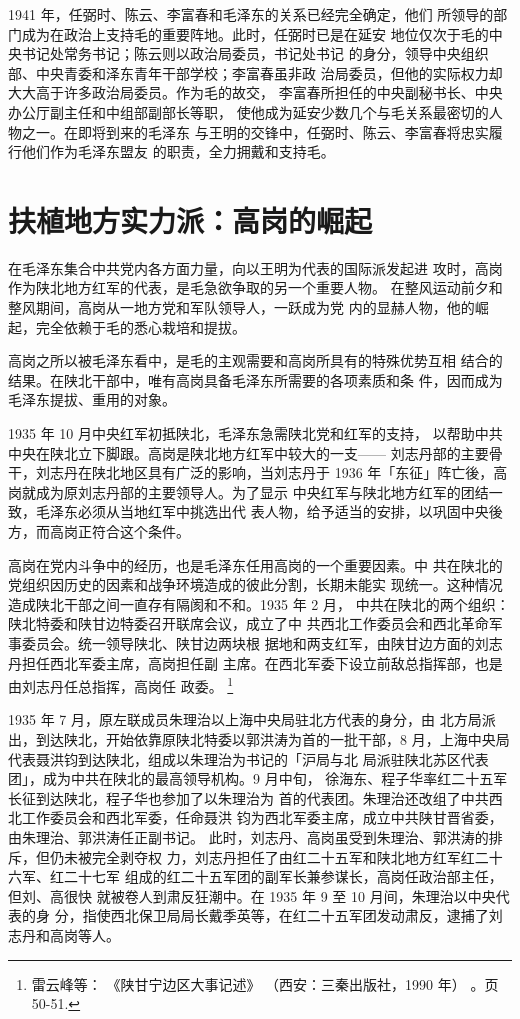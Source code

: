 1941 年，任弼时、陈云、李富春和毛泽东的关系已经完全确定，他们
所领导的部门成为在政治上支持毛的重要阵地。此时，任弼时已是在延安
地位仅次于毛的中央书记处常务书记；陈云则以政治局委员，书记处书记
的身分，领导中央组织部、中央青委和泽东青年干部学校；李富春虽非政
治局委员，但他的实际权力却大大高于许多政治局委员。作为毛的故交，
李富春所担任的中央副秘书长、中央办公厅副主任和中组部副部长等职，
使他成为延安少数几个与毛关系最密切的人物之一。在即将到来的毛泽东
与王明的交锋中，任弼时、陈云、李富春将忠实履行他们作为毛泽东盟友
的职责，全力拥戴和支持毛。
\section{扶植地方实力派：高岗的崛起
}
在毛泽东集合中共党内各方面力量，向以王明为代表的国际派发起进
攻时，高岗作为陕北地方红军的代表，是毛急欲争取的另一个重要人物。
在整风运动前夕和整风期间，高岗从一地方党和军队领导人，一跃成为党
内的显赫人物，他的崛起，完全依赖于毛的悉心栽培和提拔。

高岗之所以被毛泽东看中，是毛的主观需要和高岗所具有的特殊优势互相
结合的结果。在陕北干部中，唯有高岗具备毛泽东所需要的各项素质和条
件，因而成为毛泽东提拔、重用的对象。

1935 年 10 月中央红军初抵陕北，毛泽东急需陕北党和红军的支持，
以帮助中共中央在陕北立下脚跟。高岗是陕北地方红军中较大的一支——
刘志丹部的主要骨干，刘志丹在陕北地区具有广泛的影响，当刘志丹于
1936 年「东征」阵亡後，高岗就成为原刘志丹部的主要领导人。为了显示
中央红军与陕北地方红军的团结一致，毛泽东必须从当地红军中挑选出代
表人物，给予适当的安排，以巩固中央後方，而高岗正符合这个条件。

高岗在党内斗争中的经历，也是毛泽东任用高岗的一个重要因素。中
共在陕北的党组织因历史的因素和战争环境造成的彼此分割，长期未能实
现统一。这种情况造成陕北干部之间一直存有隔阂和不和。1935 年 2 月，
中共在陕北的两个组织：陕北特委和陕甘边特委召开联席会议，成立了中
共西北工作委员会和西北革命军事委员会。统一领导陕北、陕甘边两块根
据地和两支红军，由陕甘边方面的刘志丹担任西北军委主席，高岗担任副
主席。在西北军委下设立前敌总指挥部，也是由刘志丹任总指挥，高岗任
政委。
\footnote{雷云峰等：
《陕甘宁边区大事记述》
（西安：三秦出版社，1990 年）
。页 50-51. 
}

1935 年 7 月，原左联成员朱理治以上海中央局驻北方代表的身分，由
北方局派出，到达陕北，开始依靠原陕北特委以郭洪涛为首的一批干部，8
月，上海中央局代表聂洪钧到达陕北，组成以朱理治为书记的「沪局与北
局派驻陕北苏区代表团」，成为中共在陕北的最高领导机构。9 月中旬，
徐海东、程子华率红二十五军长征到达陕北，程子华也参加了以朱理治为
首的代表团。朱理治还改组了中共西北工作委员会和西北军委，任命聂洪
钧为西北军委主席，成立中共陕甘晋省委，由朱理治、郭洪涛任正副书记。
此时，刘志丹、高岗虽受到朱理治、郭洪涛的排斥，但仍未被完全剥夺权
力，刘志丹担任了由红二十五军和陕北地方红军红二十六军、红二十七军
组成的红二十五军团的副军长兼参谋长，高岗任政治部主任，但刘、高很快
就被卷人到肃反狂潮中。在 1935 年 9 至 10 月间，朱理治以中央代表的身
分，指使西北保卫局局长戴季英等，在红二十五军团发动肃反，逮捕了刘
志丹和高岗等人。

